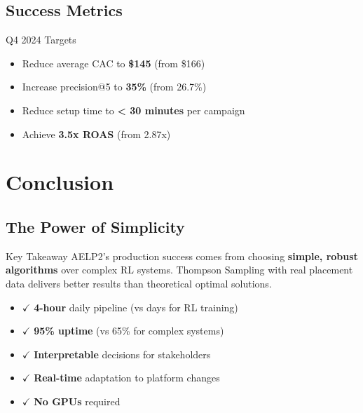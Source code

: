 \documentclass[11pt,a4paper]{report}
\begin{document}
\section{Success Metrics}

\begin{metricbox}{Q4 2024 Targets}
\begin{itemize}
    \item Reduce average CAC to \textbf{\$145} (from \$166)
    \item Increase precision@5 to \textbf{35\%} (from 26.7\%)
    \item Reduce setup time to \textbf{< 30 minutes} per campaign
    \item Achieve \textbf{3.5x ROAS} (from 2.87x)
\end{itemize}
\end{metricbox}

\chapter{Conclusion}

\section{The Power of Simplicity}

\begin{insightbox}{Key Takeaway}
AELP2's production success comes from choosing \textbf{simple, robust algorithms} over complex RL systems. Thompson Sampling with real placement data delivers better results than theoretical optimal solutions.
\end{insightbox}

\begin{center}
\begin{tcolorbox}[
    colback=aelpgreen!10,
    colframe=aelpgreen,
    width=0.8\textwidth,
    arc=3mm,
    boxrule=2pt,
    center,
    title={[WINS] Production Wins},
    fonttitle=\Large\bfseries\color{white},
    colbacktitle=aelpgreen
]
\centering\large
\begin{itemize}[leftmargin=*]
    \item $\checkmark$ \textbf{4-hour} daily pipeline (vs days for RL training)
    \item $\checkmark$ \textbf{95\% uptime} (vs 65\% for complex systems)
    \item $\checkmark$ \textbf{Interpretable} decisions for stakeholders
    \item $\checkmark$ \textbf{Real-time} adaptation to platform changes
    \item $\checkmark$ \textbf{No GPUs} required
\end{itemize}
\end{tcolorbox}
\end{center}
\end{document}
